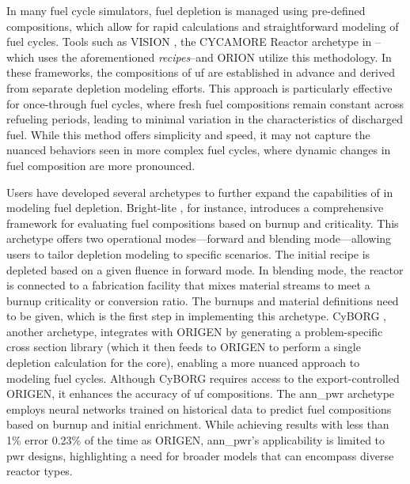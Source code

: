 In many fuel cycle simulators, fuel depletion is managed using pre-defined
compositions, which allow for rapid calculations and straightforward modeling
of fuel cycles. Tools such as VISION \cite{yacout_visionverifiable_2006}, the
CYCAMORE Reactor archetype in \cyclus--which uses the aforementioned
\textit{recipes}--and ORION utilize this methodology. In these frameworks, the
compositions of \gls{uf} are established in advance and derived from
separate depletion modeling efforts. This approach is particularly effective
for once-through fuel cycles, where fresh fuel compositions remain constant
across refueling periods, leading to minimal variation in the characteristics
of discharged fuel. While this method offers simplicity and speed, it may not
capture the nuanced behaviors seen in more complex fuel cycles, where dynamic
changes in fuel composition are more pronounced.

Users have developed several archetypes to further expand the capabilities of \cyclus in modeling fuel depletion. Bright-lite \cite{schneider_integrated_2016}, for instance, introduces a comprehensive
framework for evaluating fuel compositions based on burnup and criticality.
This archetype offers two operational modes—forward and blending mode—allowing
users to tailor depletion modeling to specific scenarios. The initial recipe is depleted based on a given fluence in forward mode. In blending mode, the
reactor is connected to a fabrication facility that mixes material streams to
meet a burnup criticality or conversion ratio. The burnups and material
definitions need to be given, which is the first step in implementing this
archetype. CyBORG \cite{skutnik_cyborg_2016}, another \cyclus archetype,
integrates \cyclus with ORIGEN by generating a problem-specific cross section
library (which it then feeds to ORIGEN to perform a single depletion
calculation for the core), enabling a more nuanced approach to modeling fuel
cycles. Although CyBORG requires access to the export-controlled ORIGEN, it
enhances the accuracy of \gls{uf} compositions. The ann\_pwr \cite{bae_deep_2020} archetype employs neural networks trained on
historical data to predict fuel compositions based on burnup and initial
enrichment. While achieving results with less than 1\% error 0.23\% of the
time as ORIGEN, ann\_pwr's applicability is limited to \gls{pwr} designs, highlighting a need for broader models that can encompass diverse
reactor types.

